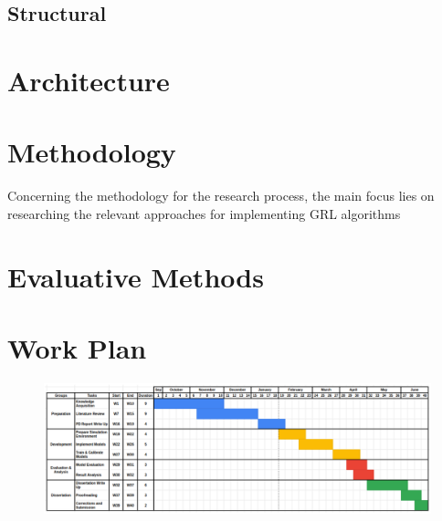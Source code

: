 \subsection{Structural}

\section{Architecture}



\section{Methodology}

Concerning the methodology for the research process, the main focus lies on researching the relevant approaches for implementing \ac{GRL} algorithms

\section{Evaluative Methods}

\section{Work Plan}

\begin{figure}
	\includegraphics[width=1.0\linewidth]{./figures/gantt-chart.png}
\end{figure}

